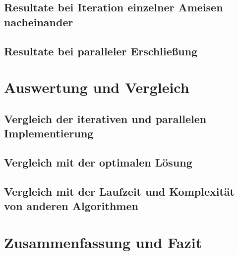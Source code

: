 \documentclass[doktyp=barbeit, sprache=german]{TUBAFarbeiten}
\begin{document}
\subsection{Resultate bei Iteration einzelner Ameisen nacheinander}
\subsection{Resultate bei paralleler Erschließung}
\section{Auswertung und Vergleich}
\subsection{Vergleich der iterativen und parallelen Implementierung}
\subsection{Vergleich mit der optimalen Lösung}
\subsection{Vergleich mit der Laufzeit und Komplexität von anderen Algorithmen}
\section{Zusammenfassung und Fazit}
\newpage
\appendix
\end{document}
